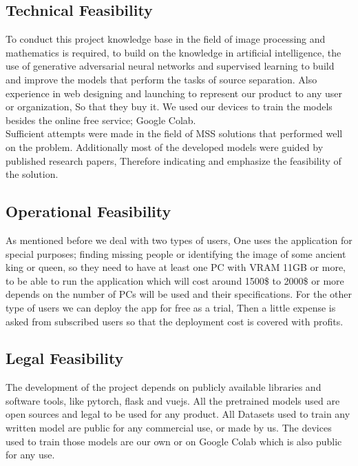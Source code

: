 \subsection{ Technical Feasibility}

To conduct this project knowledge base in the field of image processing and mathematics is required, to build on the knowledge in artificial intelligence, the use of generative adversarial neural networks and supervised learning to build and improve the models that perform the tasks of source separation. Also experience in web designing and launching to represent our product to any user or organization, So that they buy it. We used our devices to train the models besides the online free service; Google Colab. \\ 
Sufficient attempts were made in the field of MSS solutions that performed well on the problem. Additionally most of the developed models were guided by published research papers, Therefore indicating and emphasize the feasibility of the solution.

\subsection{ Operational Feasibility }

As mentioned before we deal with two types of users, One uses the application for special purposes; finding missing people or identifying the image of some ancient king or queen, so they need to have at least one PC with VRAM 11GB or more, to be able to run the application which will cost around 1500\$ to 2000\$ or more depends on the number of PCs will be used and their specifications. For the other type of users we can deploy the app for free as a trial, Then a little expense is asked from subscribed users so that the deployment cost is covered with profits. 

\subsection{ Legal Feasibility }

The development of the project depends on publicly available libraries and software tools, like pytorch, flask and vuejs. All the pretrained models used are open sources and legal to be used for any product. All Datasets used to train any written model are public for any commercial use, or made by us. The devices used to train those models are our own or on Google Colab which is also public for any use.

